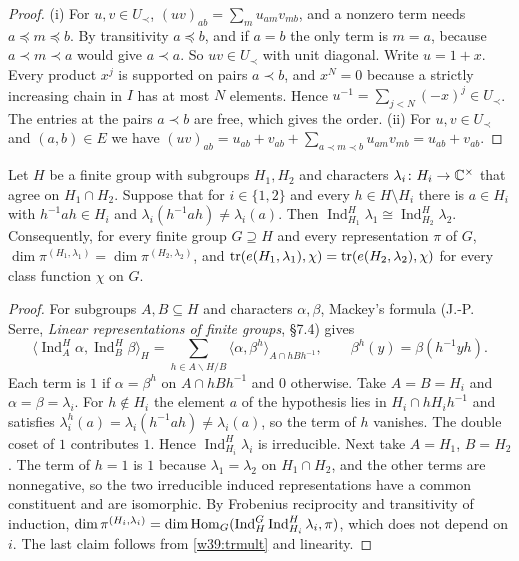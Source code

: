 \begin{proof}
(i) For $u,v\in U_\prec$, $(uv)_{ab}=\sum_mu_{am}v_{mb}$, and a nonzero term needs $a\preceq m\preceq b$. By transitivity $a\preceq b$, and if $a=b$ the only term is $m=a$, because $a\prec m\prec a$ would give $a\prec a$. So $uv\in U_\prec$ with unit diagonal. Write $u=1+x$. Every product $x^j$ is supported on pairs $a\prec b$, and $x^N=0$ because a strictly increasing chain in $I$ has at most $N$ elements. Hence $u^{-1}=\sum_{j<N}(-x)^j\in U_\prec$. The entries at the pairs $a\prec b$ are free, which gives the order.
(ii) For $u,v\in U_\prec$ and $(a,b)\in E$ we have $(uv)_{ab}=u_{ab}+v_{ab}+\sum_{a\prec m\prec b}u_{am}v_{mb}=u_{ab}+v_{ab}$.
\end{proof}

\begin{lemma}\label{w39:mackey}
Let $H$ be a finite group with subgroups $H_1,H_2$ and characters $\lambda_i\colon H_i\to\mathbb C^\times$ that agree on $H_1\cap H_2$. Suppose that for $i\in\{1,2\}$ and every $h\in H\setminus H_i$ there is $a\in H_i$ with $h^{-1}ah\in H_i$ and $\lambda_i(h^{-1}ah)\ne\lambda_i(a)$. Then $\operatorname{Ind}_{H_1}^H\lambda_1\cong\operatorname{Ind}_{H_2}^H\lambda_2$. Consequently, for every finite group $G\supseteq H$ and every representation $\pi$ of $G$, $\dim\pi^{(H_1,\lambda_1)}=\dim\pi^{(H_2,\lambda_2)}$, and $\operatorname{tr}(e(H_1,\lambda_1),\chi)=\operatorname{tr}(e(H_2,\lambda_2),\chi)$ for every class function $\chi$ on $G$.
\end{lemma}

\begin{proof}
For subgroups $A,B\subseteq H$ and characters $\alpha,\beta$, Mackey's formula (J.-P. Serre, \emph{Linear representations of finite groups}, \S7.4) gives
\[
\bigl\langle\operatorname{Ind}_A^H\alpha,\operatorname{Ind}_B^H\beta\bigr\rangle_H=\sum_{h\in A\backslash H/B}\bigl\langle\alpha,\beta^h\bigr\rangle_{A\cap hBh^{-1}},\qquad\beta^h(y)=\beta(h^{-1}yh).
\]
Each term is $1$ if $\alpha=\beta^h$ on $A\cap hBh^{-1}$ and $0$ otherwise. Take $A=B=H_i$ and $\alpha=\beta=\lambda_i$. For $h\notin H_i$ the element $a$ of the hypothesis lies in $H_i\cap hH_ih^{-1}$ and satisfies $\lambda_i^h(a)=\lambda_i(h^{-1}ah)\ne\lambda_i(a)$, so the term of $h$ vanishes. The double coset of $1$ contributes $1$. Hence $\operatorname{Ind}_{H_i}^H\lambda_i$ is irreducible. Next take $A=H_1$, $B=H_2$. The term of $h=1$ is $1$ because $\lambda_1=\lambda_2$ on $H_1\cap H_2$, and the other terms are nonnegative, so the two irreducible induced representations have a common constituent and are isomorphic. By Frobenius reciprocity and transitivity of induction, $\dim\pi^{(H_i,\lambda_i)}=\dim\operatorname{Hom}_G(\operatorname{Ind}_H^G\operatorname{Ind}_{H_i}^H\lambda_i,\pi)$, which does not depend on $i$. The last claim follows from \eqref{w39:trmult} and linearity.
\end{proof}

